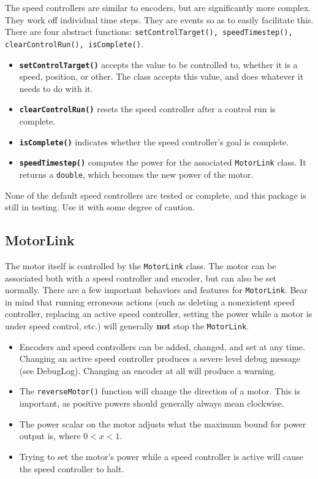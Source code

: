\documentclass[a4paper]{article}
\begin{document}
The speed controllers are similar to encoders, but are significantly more complex. They work off individual time steps. They are events so as to easily facilitate this. There are four abstract functions: \lstinline{setControlTarget(), speedTimestep(), clearControlRun(), isComplete()}. 
\begin{itemize}
	\item{\textbf{\lstinline{setControlTarget()}} accepts the value to be controlled to, whether it is a speed, position, or other. The class accepts this value, and does whatever it needs to do with it.}
	\item{\textbf{\lstinline{clearControlRun()}} resets the speed controller after a control run is complete.}
	\item{\textbf{\lstinline{isComplete()}} indicates whether the speed controller's goal is complete.}
	\item{\textbf{\lstinline{speedTimestep()}} computes the power for the associated \lstinline{MotorLink} class. It returns a \lstinline{double}, which becomes the new power of the motor.}
\end{itemize}

None of the default speed controllers are tested or complete, and this package is still in testing. Use it with some degree of caution.

\subsection{MotorLink}

The motor itself is controlled by the \lstinline{MotorLink} class. The motor can be associated both with a speed controller and encoder, but can also be set normally. There are a few important behaviors and features for \lstinline{MotorLink}. Bear in mind that running erroneous actions (such as deleting a nonexistent speed controller, replacing an active speed controller, setting the power while a motor is under speed control, etc.) will generally \textbf{not} stop the \lstinline{MotorLink}.
\begin{itemize}
	\item{Encoders and speed controllers can be added, changed, and set at any time. Changing an active speed controller produces a severe level debug message (see DebugLog). Changing an encoder at all will produce a warning.}
	\item{The \lstinline{reverseMotor()} function will change the direction of a motor. This is important, as positive powers should generally always mean clockwise.}
	\item{The power scalar on the motor adjusts what the maximum bound for power output is, where $0<x<1$.}
	\item{Trying to set the motor's power while a speed controller is active will cause the speed controller to halt.}
\end{itemize}
\end{document}
